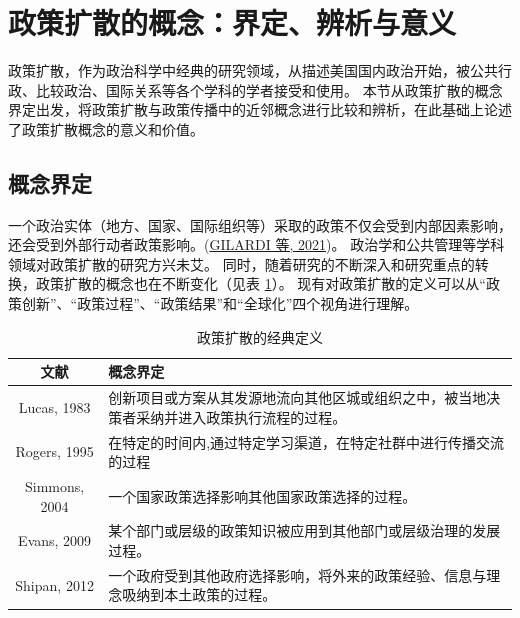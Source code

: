 \documentclass[
  12pt,
]{ctexart}
\begin{document}
\newpage

\hypertarget{ux653fux7b56ux6269ux6563ux7684ux6982ux5ff5ux754cux5b9aux8fa8ux6790ux4e0eux610fux4e49}{%
\section{政策扩散的概念：界定、辨析与意义}\label{ux653fux7b56ux6269ux6563ux7684ux6982ux5ff5ux754cux5b9aux8fa8ux6790ux4e0eux610fux4e49}}

政策扩散，作为政治科学中经典的研究领域，从描述美国国内政治开始，被公共行政、比较政治、国际关系等各个学科的学者接受和使用。
本节从政策扩散的概念界定出发，将政策扩散与政策传播中的近邻概念进行比较和辨析，在此基础上论述了政策扩散概念的意义和价值。

\hypertarget{ux6982ux5ff5ux754cux5b9a}{%
\subsection{概念界定}\label{ux6982ux5ff5ux754cux5b9a}}

一个政治实体（地方、国家、国际组织等）采取的政策不仅会受到内部因素影响，还会受到外部行动者政策影响。(\protect\hyperlink{ref-GilardiEtAl2021}{GILARDI 等, 2021})。
政治学和公共管理等学科领域对政策扩散的研究方兴未艾。
同时，随着研究的不断深入和研究重点的转换，政策扩散的概念也在不断变化（见表 \ref{tab:definition}）。
现有对政策扩散的定义可以从``政策创新''、``政策过程''、``政策结果''和``全球化''四个视角进行理解。

\begin{table}[!h]

\caption{\label{tab:definition}政策扩散的经典定义}
\centering
\begin{tabular}[t]{c>{\centering\arraybackslash}p{30em}}
\toprule
文献 & 概念界定\\
\midrule
Lucas, 1983 & 创新项目或方案从其发源地流向其他区城或组织之中，被当地决策者采纳并进入政策执行流程的过程。\\
Rogers, 1995 & 在特定的时间内,通过特定学习渠道，在特定社群中进行传播交流的过程\\
Simmons, 2004 & 一个国家政策选择影响其他国家政策选择的过程。\\
Evans, 2009 & 某个部门或层级的政策知识被应用到其他部门或层级治理的发展过程。\\
Shipan, 2012 & 一个政府受到其他政府选择影响，将外来的政策经验、信息与理念吸纳到本土政策的过程。\\
\bottomrule
\end{tabular}
\end{table}
\end{document}
